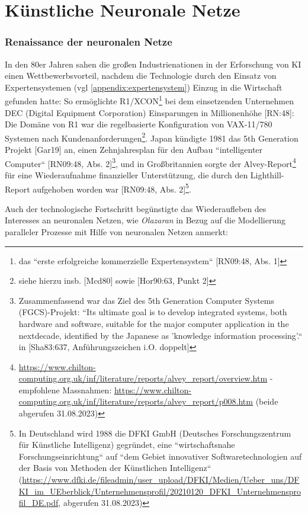 \chapter{Künstliche Neuronale Netze}


\subsection{Renaissance der neuronalen Netze}\label{renaissance}


In den 80er Jahren sahen die großen Industrienationen in der Erforschung von KI einen Wettbewerbsvorteil, nachdem die Technologie durch den Einsatz von Expertensystemen (vgl \ref{appendix:expertensystem}) Einzug in die Wirtschaft gefunden hatte: So ermöglichte R1/XCON\footnote{
    das ``erste erfolgreiche kommerzielle Expertensystem`` [RN09:48, Abs. 1]
}  bei dem einsetzenden Unternehmen DEC (Digital Equipment Corporation) Einsparungen in Millionenhöhe [RN:48]: Die Domäne von R1 war die regelbasierte Konfiguration von VAX-11/780 Systemen nach Kundenanforderungen\footnote{
    siehe hierzu insb. [Mcd80] sowie [Hor90:63, Punkt 2]
}. Japan kündigte 1981 das 5th Generation Projekt [Gar19] an, einen Zehnjahresplan für den Aufbau ``intelligenter Computer`` [RN09:48, Abs. 2]\footnote{
    Zusammenfassend war das Ziel des 5th Generation Computer Systems (FGCS)-Projekt: ``Its ultimate goal is to develop integrated systems, both hardware and software, suitable for the major computer application in the nextdecade, identified by the Japanese as 'knowledge information processing'.`` in [Sha83:637, Anführungszeichen i.O. doppelt]
}, und in Großbritannien sorgte der Alvey-Report\footnote{
    \url{https://www.chilton-computing.org.uk/inf/literature/reports/alvey\_report/overview.htm} - empfohlene Massnahmen: \url{https://www.chilton-computing.org.uk/inf/literature/reports/alvey\_report/p008.htm} (beide abgerufen 31.08.2023)
} für eine Wiederaufnahme finanzieller Unterstützung, die durch den Lighthill-Report aufgehoben worden war [RN09:48, Abs. 2]\footnote{
    In Deutschland wird 1988 die DFKI GmbH (Deutsches Forschungszentrum für Künstliche Intelligenz) gegründet, eine ``wirtschaftsnahe Forschungseinrichtung`` auf ``dem Gebiet innovativer Softwaretechnologien auf der Basis von Methoden der Künstlichen Intelligenz`` (\url{https://www.dfki.de/fileadmin/user\_upload/DFKI/Medien/Ueber\_uns/DFKI\_im\_UEberblick/Unternehmensprofil/20210120\_DFKI\_Unternehmensprofil\_DE.pdf}, abgerufen 31.08.2023)
}.

Auch der technologische Fortschritt begünstigte das Wiederaufleben des Interesses an neuronalen Netzen, wie \textit{Olazaran} in Bezug auf die Modellierung paralleler Prozesse mit Hilfe von neuronalen Netzen anmerkt:

